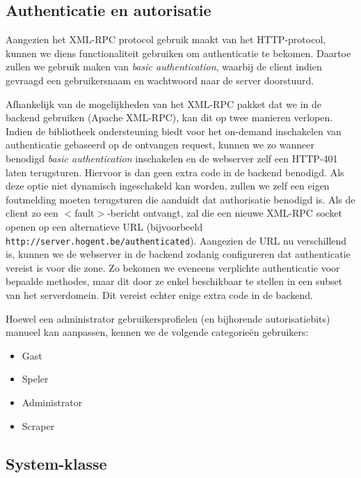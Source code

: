 \subsection{Authenticatie en autorisatie}

Aangezien het XML-RPC protocol gebruik maakt van het HTTP-protocol, kunnen we diens functionaliteit gebruiken om authenticatie te bekomen. Daartoe zullen we gebruik maken van \emph{basic authentication}, waarbij de client indien gevraagd een gebruikersnaam en wachtwoord naar de server doorstuurd.

Afhankelijk van de mogelijkheden van het XML-RPC pakket dat we in de backend gebruiken (Apache XML-RPC), kan dit op twee manieren verlopen. Indien de bibliotheek ondersteuning biedt voor het on-demand inschakelen van authenticatie gebaseerd op de ontvangen request, kunnen we zo wanneer benodigd \emph{basic authentication} inschakelen en de webserver zelf een HTTP-401 laten terugsturen. Hiervoor is dan geen extra code in de backend benodigd.
Als deze optie niet dynamisch ingeschakeld kan worden, zullen we zelf een eigen foutmelding moeten terugsturen die aanduidt dat authorisatie benodigd is. Als de client zo een $<$fault$>$-bericht ontvangt, zal die een nieuwe XML-RPC socket openen op een alternatieve URL (bijvoorbeeld \texttt{http://server.hogent.be/authenticated}). Aangezien de URL nu verschillend is, kunnen we de webserver in de backend zodanig configureren dat authenticatie vereist is voor die zone. Zo bekomen we eveneens verplichte authenticatie voor bepaalde methodes, maar dit door ze enkel beschikbaar te stellen in een subset van het serverdomein. Dit vereist echter enige extra code in de backend.

Hoewel een administrator gebruikersprofielen (en bijhorende autorisatiebits) manueel kan aanpassen, kennen we de volgende categorieën gebruikers:

\begin{itemize}
\item{Gast}
\item{Speler}
\item{Administrator}
\item{Scraper}
\end{itemize}

\subsection{System-klasse}

